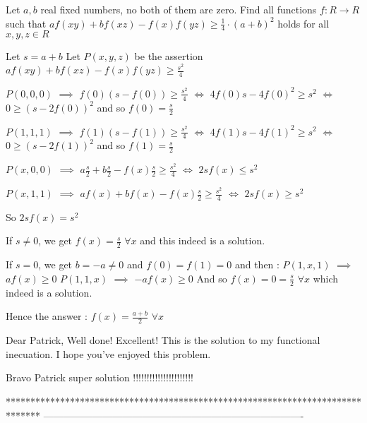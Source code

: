 \begin{solution}
	\begin{tcolorbox}Let $ a,b$ real fixed numbers, no both of them are zero.
Find all functions $ f: R\longrightarrow R$ such that
$ af(xy) + bf(xz) - f(x)f(yz)\geq \frac {1}{4}\cdot(a + b)^2$
holds for all $ x,y,z\in R$\end{tcolorbox}

Let $ s = a + b$
Let $ P(x,y,z)$ be the assertion $ af(xy) + bf(xz) - f(x)f(yz)\ge \frac {s^2}4$

$ P(0,0,0)$ $ \implies$ $ f(0)(s - f(0))\ge \frac {s^2}4$ $ \iff$ $ 4f(0)s - 4f(0)^2\ge s^2$ $ \iff$ $ 0\ge (s - 2f(0))^2$ and so $ f(0) = \frac s2$

$ P(1,1,1)$ $ \implies$ $ f(1)(s - f(1))\ge \frac {s^2}4$ $ \iff$ $ 4f(1)s - 4f(1)^2\ge s^2$ $ \iff$ $ 0\ge (s - 2f(1))^2$ and so $ f(1) = \frac s2$

$ P(x,0,0)$ $ \implies$ $ a\frac s2 + b\frac s2 - f(x)\frac s2\ge \frac {s^2}4$ $ \iff$ $ 2sf(x)\le s^2$

$ P(x,1,1)$ $ \implies$ $ af(x) + bf(x) - f(x)\frac s2\ge \frac {s^2}4$ $ \iff$ $ 2sf(x)\ge s^2$

So $ 2sf(x) = s^2$

If $ s\ne 0$, we get $ f(x) = \frac s2$ $ \forall x$ and this indeed is a solution.

If $ s = 0$, we get $ b = - a\ne 0$ and $ f(0) = f(1) = 0$ and then :
$ P(1,x,1)$ $ \implies$ $ af(x)\ge 0$
$ P(1,1,x)$ $ \implies$ $ - af(x)\ge 0$
And so $ f(x) = 0 = \frac s2$ $ \forall x$ which indeed is a solution.

Hence the answer : $ \boxed{f(x) = \frac {a+b}2}$ $ \forall x$
\end{solution}



\begin{solution}
	Dear Patrick,
Well done! Excellent! This is the solution to my functional inecuation. I hope you've enjoyed this problem.
\end{solution}



\begin{solution}
	Bravo Patrick     super solution  !!!!!!!!!!!!!!!!!!!!!!
\end{solution}
*******************************************************************************
-------------------------------------------------------------------------------

